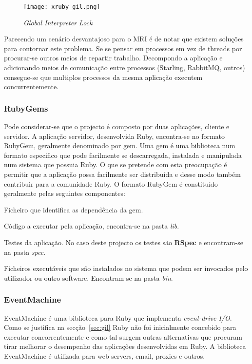 \begin{figure}[H]
\centering
\texttt{[image: xruby\_gil.png]}
\caption{\textit{Global Interpreter Lock}}
\label{fig:ruby-gil}
\end{figure}

Parecendo um cenário desvantajoso para o MRI é de notar que existem soluções para contornar este problema. Se se pensar em processos em vez de threads por procurar-se outros meios de repartir trabalho. Decompondo a aplicação e adicionando meios de comunicação entre processos (Starling, RabbitMQ, outros) consegue-se que multiplos processos da mesma aplicação executem concurrentemente.

\subsubsection{RubyGems}

Pode considerar-se que o projecto é composto por duas aplicações, cliente e servidor. A aplicação servidor, desenvolvida Ruby, encontra-se no formato RubyGem, geralmente denominado por gem. Uma gem é uma biblioteca num formato especifico que pode facilmente se descarregada, instalada e manipulada num sistema que possuia Ruby.\cite{rubygems} O que se pretende com esta preocupação é permitir que a aplicação possa facilmente ser distribuída e desse modo também contribuir para a comunidade Ruby. O formato RubyGem é constituído geralmente pelas seguintes componentes:

\begin{description}[leftmargin=!,labelwidth=\widthof{\bfseries Código da aplicação }]
\item[Gemspec] Ficheiro que identifica as dependência da gem.
\item[Código da aplicação] Código a executar pela aplicação, encontra-se na pasta \textit{lib}.
\item[Testes] Testes da aplicação. No caso deste projecto os testes são \textbf{RSpec} e encontram-se na pasta \textit{spec}.
\item[Excutáveis] Ficheiros executáveis que são instalados no sistema que podem ser invocados pelo utilizador ou outro software. Encontram-se na pasta \textit{bin}.
\end{description}

\subsubsection{EventMachine}
EventMachine é uma biblioteca para Ruby que implementa \textit{event-drive I/O}. Como se justifica na secção~\ref{sec:gil} Ruby não foi inicialmente concebido para executar concorrentemente e como tal surgem outras alternativas que procuram tirar melhorar o desempenho das aplicações desenvolvidas em Ruby. A biblioteca EventMachine é utilizada para web servers, email, proxies e outros. 

